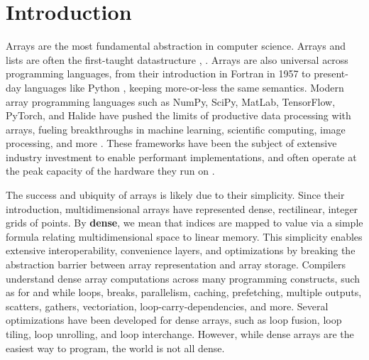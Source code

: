 
\section{Introduction}

Arrays are the most fundamental abstraction in computer science. Arrays and lists are often the first-taught datastructure
\cite[Chapter 2.2]{abelson_structure_1996}, \cite[Chapter 2.2]{knuth_art_1997}.
%
Arrays are also universal across programming languages, from their introduction
in Fortran in 1957 to present-day languages like Python
\cite{backus_fortran_1957}, keeping more-or-less the same semantics.
%
Modern
array programming languages such as NumPy, SciPy, MatLab, TensorFlow, PyTorch,
and Halide have pushed the limits of productive data processing with arrays,
fueling breakthroughs in machine learning, scientific computing, image
processing, and more  \cite{harris_array_2020, virtanen_scipy_2020,
moler_history_2020, abadi_tensorflow_2016,
paszke_pytorch_2019,ragan-kelley_halide_2013}.
%
These frameworks have been the
subject of extensive industry investment to enable performant implementations,
and often operate at the peak capacity of the hardware they run on
\cite{lo_roofline_2015}.

The success and ubiquity of arrays is likely due to their simplicity. 
%
Since
their introduction, multidimensional arrays have represented dense, rectilinear,
integer grids of points. 
%
By \textbf{dense}, we mean that indices are mapped to value via a simple formula relating multidimensional space to linear memory.
%
This
simplicity enables extensive interoperability, convenience layers, and
optimizations by breaking the abstraction barrier between array representation
and array storage.  
%
Compilers understand dense array computations across many
programming constructs, such as for and while loops, breaks, parallelism,
caching, prefetching, multiple outputs, scatters, gathers, vectoriation,
loop-carry-dependencies, and more. Several optimizations have been developed for
dense arrays, such as loop fusion, loop tiling, loop unrolling, and loop
interchange.
%
However, while dense arrays are the easiest way to program, the world is not all dense.

